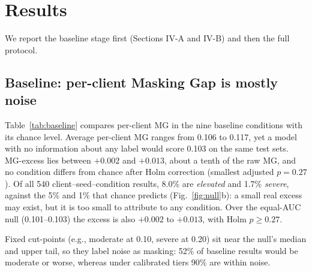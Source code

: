 \section{Results}

We report the baseline stage first (Sections IV-A and IV-B) and then the full protocol.

\subsection{Baseline: per-client Masking Gap is mostly noise}

Table~\ref{tab:baseline} compares per-client MG in the nine baseline conditions with its chance level. Average per-client MG ranges from 0.106 to 0.117, yet a model with no information about any label would score 0.103 on the same test sets. MG-excess lies between $+0.002$ and $+0.013$, about a tenth of the raw MG, and no condition differs from chance after Holm correction (smallest adjusted $p = 0.27$). Of all 540 client--seed--condition results, 8.0\% are \emph{elevated} and 1.7\% \emph{severe}, against the 5\% and 1\% that chance predicts (Fig.~\ref{fig:null}b): a small real excess may exist, but it is too small to attribute to any condition. Over the equal-AUC null (0.101--0.103) the excess is also $+0.002$ to $+0.013$, with Holm $p \geq 0.27$.

Fixed cut-points (e.g., moderate at 0.10, severe at 0.20) sit near the null's median and upper tail, so they label noise as masking: 52\% of baseline results would be moderate or worse, whereas under calibrated tiers 90\% are within noise.

